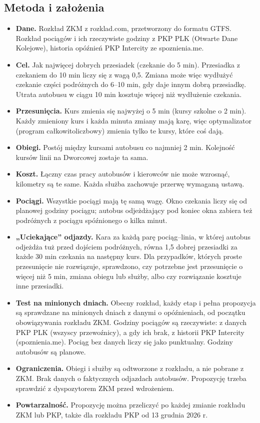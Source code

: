 \documentclass[10pt,a4paper]{article}
\begin{document}
\subsection*{Metoda i założenia}
\begin{itemize}
\item \textbf{Dane.} Rozkład ZKM z rozklad.com, przetworzony do formatu GTFS. Rozkład pociągów i ich rzeczywiste godziny z PKP PLK (Otwarte Dane Kolejowe), historia opóźnień PKP Intercity ze spoznienia.me.
\item \textbf{Cel.} Jak najwięcej dobrych przesiadek (czekanie do 5 min). Przesiadka z czekaniem do 10 min liczy się z wagą 0,5. Zmiana może więc wydłużyć czekanie części podróżnych do 6--10 min, gdy daje innym dobrą przesiadkę. Utrata autobusu w ciągu 10 min kosztuje więcej niż wydłużenie czekania.
\item \textbf{Przesunięcia.} Kurs zmienia się najwyżej o 5 min (kursy szkolne o 2 min). Każdy zmieniony kurs i każda minuta zmiany mają karę, więc optymalizator (program całkowitoliczbowy) zmienia tylko te kursy, które coś dają.
\item \textbf{Obiegi.} Postój między kursami autobusu co najmniej 2 min. Kolejność kursów linii na Dworcowej zostaje ta sama.
\item \textbf{Koszt.} Łączny czas pracy autobusów i kierowców nie może wzrosnąć, kilometry są te same. Każda służba zachowuje przerwę wymaganą ustawą.
\item \textbf{Pociągi.} Wszystkie pociągi mają tę samą wagę. Okno czekania liczy się od planowej godziny pociągu; autobus odjeżdżający pod koniec okna zabiera też podróżnych z pociągu spóźnionego o kilka minut.
\item \textbf{„Uciekające” odjazdy.} Kara za każdą parę pociąg--linia, w której autobus odjeżdża tuż przed dojściem podróżnych, równa 1,5 dobrej przesiadki za każde 30 min czekania na następny kurs. Dla przypadków, których proste przesunięcie nie rozwiązuje, sprawdzono, czy potrzebne jest przesunięcie o więcej niż 5 min, zmiana obiegu lub służby, albo czy rozwiązanie kosztuje inne przesiadki.
\item \textbf{Test na minionych dniach.} Obecny rozkład, każdy etap i pełna propozycja są sprawdzane na minionych dniach z danymi o opóźnieniach, od początku obowiązywania rozkładu ZKM. Godziny pociągów są rzeczywiste: z danych PKP PLK (wszyscy przewoźnicy), a gdy ich brak, z historii PKP Intercity (spoznienia.me). Pociąg bez danych liczy się jako punktualny. Godziny autobusów są planowe.
\item \textbf{Ograniczenia.} Obiegi i służby są odtworzone z rozkładu, a nie pobrane z ZKM. Brak danych o faktycznych odjazdach autobusów. Propozycję trzeba sprawdzić z dyspozytorem ZKM przed wdrożeniem.
\item \textbf{Powtarzalność.} Propozycję można przeliczyć po każdej zmianie rozkładu ZKM lub PKP, także dla rozkładu PKP od 13 grudnia 2026 r.
\end{itemize}
\clearpage
\end{document}
